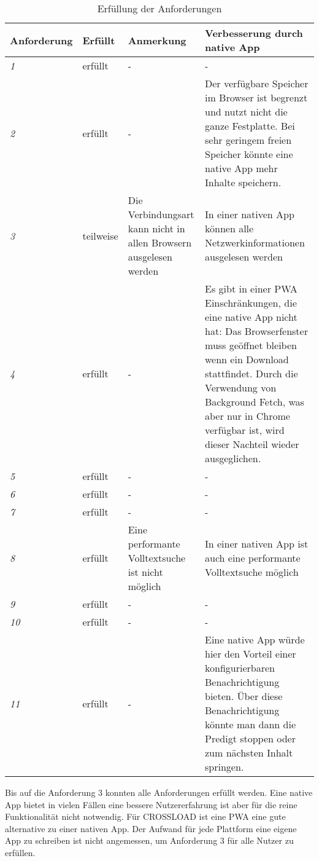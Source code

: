 \begin{sidewaystable}[h]
  \renewcommand{\arraystretch}{1.2}
  \centering
  \sffamily
  \begin{footnotesize}
    \begin{tabularx}{1.0\textwidth}{l l X X}
      \toprule
      \textbf{Anforderung} & \textbf{Erfüllt} & \textbf{Anmerkung} & \textbf{Verbesserung durch native App} \\
      \midrule
      \emph{1} & erfüllt & - & - \\
      \emph{2} & erfüllt & - & Der verfügbare Speicher im Browser ist begrenzt und nutzt nicht die ganze Festplatte. Bei sehr geringem freien Speicher könnte eine native App mehr Inhalte speichern. \\
      \emph{3} & teilweise & Die Verbindungsart kann nicht in allen Browsern ausgelesen werden & In einer nativen App können alle Netzwerkinformationen ausgelesen werden \\
      \emph{4} & erfüllt & - & Es gibt in einer \ac{PWA} Einschränkungen, die eine native App nicht hat: Das Browserfenster muss geöffnet bleiben wenn ein Download stattfindet. Durch die Verwendung von Background Fetch, was aber nur in Chrome verfügbar ist, wird dieser Nachteil wieder ausgeglichen. \\
      \emph{5} & erfüllt & - & - \\
      \emph{6} & erfüllt & - & - \\
      \emph{7} & erfüllt & - & - \\
      \emph{8} & erfüllt & Eine performante Volltextsuche ist nicht möglich & In einer nativen App ist auch eine performante Volltextsuche möglich \\
      \emph{9} & erfüllt & - & - \\
      \emph{10} & erfüllt & - & - \\
      \emph{11} & erfüllt & - & Eine native App würde hier den Vorteil einer konfigurierbaren Benachrichtigung bieten. Über diese Benachrichtigung könnte man dann die Predigt stoppen oder zum nächsten Inhalt springen. \\
      \bottomrule
    \end{tabularx}
  \end{footnotesize}
  \rmfamily
  \caption{Erfüllung der Anforderungen}
  \label{Anforderungen-Tabelle}
\end{sidewaystable}

Bis auf die Anforderung 3 konnten alle Anforderungen erfüllt werden. Eine native App bietet in vielen Fällen eine bessere Nutzererfahrung ist aber für die reine Funktionalität nicht notwendig. Für CROSSLOAD ist eine \ac{PWA} eine gute alternative zu einer nativen App. Der Aufwand für jede Plattform eine eigene App zu schreiben ist nicht angemessen, um Anforderung 3 für alle Nutzer zu erfüllen. 

